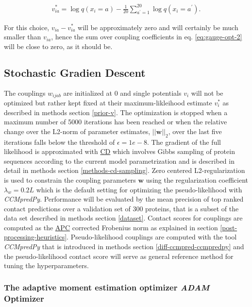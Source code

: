 \documentclass[11pt,a4paper,twoside]{book}
\newcommand{\eq}{\!=\!}
\newcommand{\vi}{v_{i}}
\newcommand{\via}{v_{ia}}
\newcommand{\w}{\mathbf{w}}
\newcommand{\wijab}{w_{ijab}}
\theoremstyle{definition}
\theoremstyle{definition}
\theoremstyle{remark}
\begin{document}
\begin{align}
\via^* = \log q(x_i \eq a) - \frac{1}{20} \sum_{a^{\prime}=1}^{20} \log q(x_i \eq a^{\prime}) .
\label{eq:prior-v}
\end{align}

For this choice, \(\via - \via^*\) will be approximately zero and will
certainly be much smaller than \(\via\), hence the sum over coupling
coefficients in eq. \eqref{eq:gauge-opt-2} will be close to zero, as it
should be.

\subsection{Stochastic Gradien Descent}\label{methods-sgd}

The couplings \(\wijab\) are initialized at 0 and single potentials
\(\vi\) will not be optimized but rather kept fixed at their
maximum-likleihood estimate \(\vi^*\) as described in methods section
\ref{prior-v}. The optimization is stopped when a maximum number of 5000
iterations has been reached or when the relative change over the L2-norm
of parameter estimates, \(||\w||_2\), over the last five iterations
falls below the threshold of \(\epsilon = 1e-8\). The gradient of the
full likelihood is approximated with \protect\hyperlink{abbrev}{CD}
which involves Gibbs sampling of protein sequences according to the
current model parametrization and is described in detail in methods
section \ref{methods-cd-sampling}. Zero centered L2-regularization is
used to constrain the coupling parameters \(\w\) using the
regularization coefficient \(\lambda_w = 0.2L\) which is the default
setting for optimizing the pseudo-likelihood with \emph{CCMpredPy}.
Performance will be evaluated by the mean precision of top ranked
contact predictions over a validation set of 300 proteins, that is a
subset of the data set described in methods section \ref{dataset}.
Contact scores for couplings are computed as the
\protect\hyperlink{abbrev}{APC} corrected Frobenius norm as explained in
section \ref{post-processing-heuristics}. Pseudo-likelihood couplings
are computed with the tool \emph{CCMpredPy} that is introduced in
methods section \ref{diff-ccmpred-ccmpredpy} and the pseudo-likelihood
contact score will serve as general reference method for tuning the
hyperparameters.

\subsubsection{\texorpdfstring{The adaptive moment estimation optimizer
\emph{ADAM}
Optimizer}{The adaptive moment estimation optimizer ADAM Optimizer}}\label{methods-full-likelihood-adam}
\end{document}
